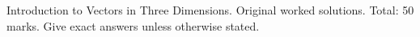 \def\housemode{sol}
\def\diquestionsonly{1}

\def\risoltitle{H2 Math Vectors I Homework 1: Solutions}

\risolfront
{\small\textcolor{black!60}{Introduction to Vectors in Three Dimensions. Original worked solutions. Total: 50 marks. Give exact answers unless otherwise stated.}}\par\medskip
{}
\diend


